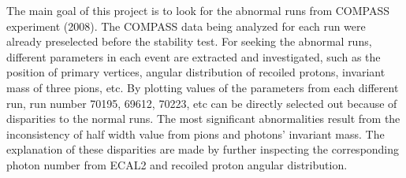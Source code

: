 The main goal of this project is to look for the abnormal runs from COMPASS experiment (2008). The COMPASS data being analyzed for each run were already preselected before the stability test. For seeking the abnormal runs, different parameters in each event are extracted and investigated, such as the position of primary vertices, angular distribution of recoiled protons, invariant mass of three pions, etc. By plotting values of the parameters from each different run, run number 70195, 69612, 70223, etc can be directly selected out because of disparities to the normal runs. The most significant abnormalities result from the inconsistency of half width value from pions and photons' invariant mass. The explanation of these disparities are made by further inspecting the corresponding photon number from ECAL2 and recoiled proton angular distribution.
\newline
\newline
\newline
